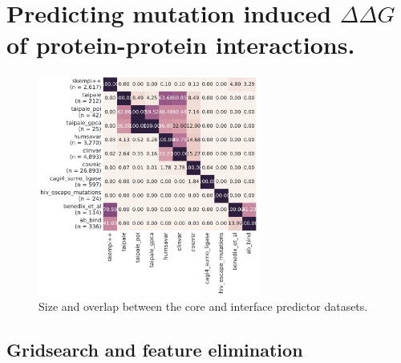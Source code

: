 \section{Predicting mutation induced $\Delta \Delta G$ of protein-protein interactions.}

\begin{figure}[ht]
	\centering
	\includegraphics[width=0.65\textwidth]{static/elaspic_training_set/data_statistics/training_set_overlap_data_df_interface.pdf}
	\caption[Interface predictor datasets.]{Size and overlap between the core and interface predictor datasets.}
\end{figure}


\subsection{Gridsearch and feature elimination}

